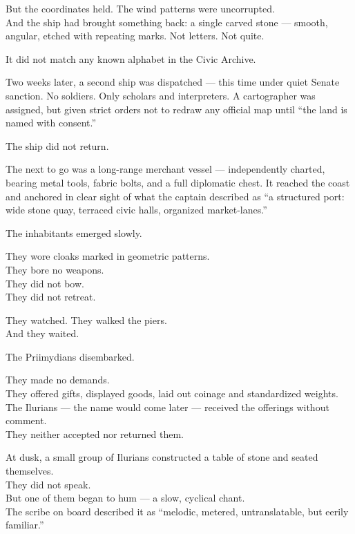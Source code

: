 \documentclass[9pt]{article}
\begin{document}
But the coordinates held. The wind patterns were uncorrupted.\\
And the ship had brought something back: a single carved stone --- smooth, angular, etched with repeating marks. Not letters. Not quite.

It did not match any known alphabet in the Civic Archive.

\vspace{1em}

Two weeks later, a second ship was dispatched --- this time under quiet Senate sanction. No soldiers. Only scholars and interpreters. A cartographer was assigned, but given strict orders not to redraw any official map until ``the land is named with consent.”

The ship did not return.

\vspace{1em}

The next to go was a long-range merchant vessel --- independently charted, bearing metal tools, fabric bolts, and a full diplomatic chest. It reached the coast and anchored in clear sight of what the captain described as ``a structured port: wide stone quay, terraced civic halls, organized market-lanes.”

The inhabitants emerged slowly.

They wore cloaks marked in geometric patterns.\\
They bore no weapons.\\
They did not bow.\\
They did not retreat.

They watched. They walked the piers.\\
And they waited.

\vspace{1em}

The Priimydians disembarked.

They made no demands.\\
They offered gifts, displayed goods, laid out coinage and standardized weights.\\
The Ilurians --- the name would come later --- received the offerings without comment.\\
They neither accepted nor returned them.

At dusk, a small group of Ilurians constructed a table of stone and seated themselves.\\
They did not speak.\\
But one of them began to hum --- a slow, cyclical chant.\\
The scribe on board described it as ``melodic, metered, untranslatable, but eerily familiar.”
\end{document}
